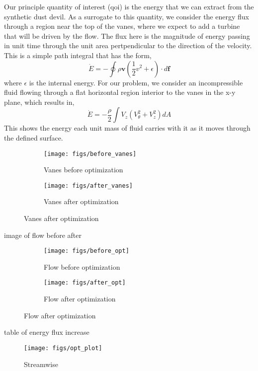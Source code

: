 Our principle quantity of interest (qoi) is the energy that we can
extract from the synthetic dust devil. As a surrogate to this quantity,
we consider the energy flux through a region near the top of the vanes,
where we expect to add a turbine that will be driven by the flow. The
flux here is the magnitude of energy passing in unit time through the
unit area pertpendicular to the direction of the velocity. This is a
simple path integral that has the form\cite{landau1959fm},  
\begin{equation}
 \dot E = -\oint \rho \textbf{v}(\frac{1}{2}v^2 + \epsilon) \cdot d \textbf{f}
\end{equation}
where $\epsilon$ is the internal energy. %
For our problem, we consider an incompressible fluid flowing through a
flat horizontal region interior to the vanes in the x-y plane, which
results in, 
 \begin{equation}
 \dot E = -\frac{\rho }{2} \int V_z (V_{\theta}^2 + V_z^2 ) dA
 \end{equation}
This shows the energy each unit mass of fluid carries with it as it
moves through the defined surface. 

\begin{figure}[htb!]
 \begin{subfigure}{.5\textwidth}
  \centering
  \texttt{[image: figs/before\_vanes]}
  \caption{Vanes before optimization}
  \label{fig:vt-wind-vert}
 \end{subfigure}%
 \begin{subfigure}{.5\textwidth}
  \centering
  \texttt{[image: figs/after\_vanes]}
  \caption{Vanes after optimization}
  \label{fig:vz-wind-vert}
 \end{subfigure}%
\end{figure}


image of flow before after

\begin{figure}[htb!]
 \begin{subfigure}{.5\textwidth}
  \centering
  \texttt{[image: figs/before\_opt]}
  \caption{Flow before optimization}
 \end{subfigure}%
 \begin{subfigure}{.5\textwidth}
  \centering
  \texttt{[image: figs/after\_opt]}
  \caption{Flow after optimization}
 \end{subfigure}%
  \label{fig:opt_flow}
\end{figure}

table of energy flux increase

\begin{figure}[htb]
 \centering
 \texttt{[image: figs/opt\_plot]}
 \caption{Streamwise}
 \label{fig:opt_plot}
\end{figure}
